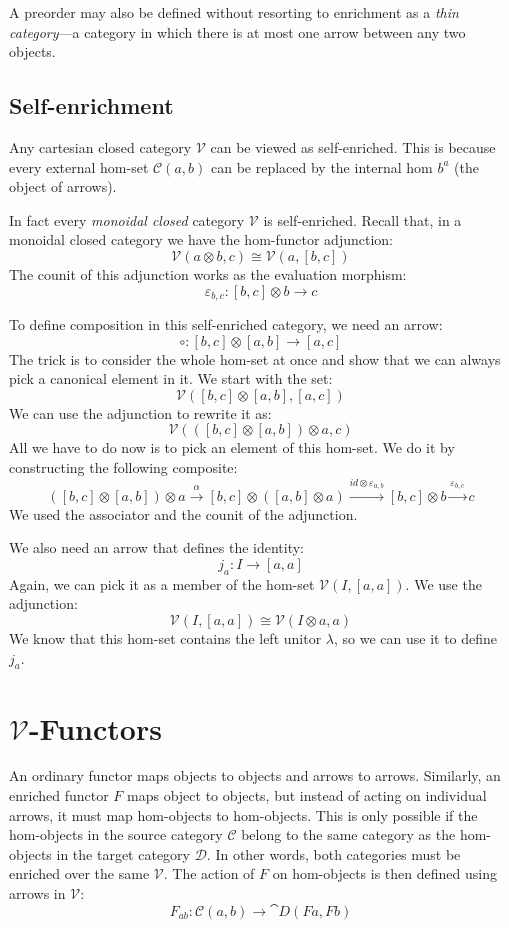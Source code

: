 \documentclass[DaoFP]{subfiles}
\begin{document}
A preorder may also be defined without resorting to enrichment as a \emph{thin category}---a category in which there is at most one arrow between any two objects.

\subsection{Self-enrichment}

Any cartesian closed category $\mathcal V$ can be viewed as self-enriched. This is because every external hom-set $\mathcal C(a, b)$ can be replaced by the internal hom $b^a$ (the object of arrows). 

In fact every \emph{monoidal closed} category $\mathcal V$ is self-enriched. Recall that, in a monoidal closed category we have the hom-functor adjunction:
\[ \mathcal V (a \otimes b, c) \cong \mathcal V (a, [b, c]) \]
The counit of this adjunction works as the evaluation morphism:
\[ \varepsilon_{b, c} \colon [b, c] \otimes b \to c \]

To define composition in this self-enriched category, we need an arrow:
\[ \circ \colon [b, c] \otimes [a, b] \to [a, c] \]
The trick is to consider the whole hom-set at once and show that we can always pick a canonical element in it. We start with the set:
\[ \mathcal V([b, c] \otimes [a, b], [a, c]) \]
We can use the adjunction to rewrite it as:
\[  \mathcal V( ([b, c] \otimes [a, b]) \otimes a, c) \]
All we have to do now is to pick an element of this hom-set. We do it by constructing the following composite:
\[ ([b, c] \otimes [a, b]) \otimes a \xrightarrow{\alpha}  
    [b, c] \otimes ([a, b] \otimes a) \xrightarrow{id \otimes \varepsilon_{a, b} }
    [b, c] \otimes b \xrightarrow{\varepsilon_{b, c}} c \]
We used the associator and the counit of the adjunction.

We also need an arrow that defines the identity:
\[ j_a \colon I \to [a, a] \]
Again, we can pick it as a member of the hom-set $\mathcal V(I, [a, a])$. We use the adjunction:
\[ \mathcal V(I, [a, a]) \cong \mathcal V (I \otimes a, a) \]
We know that this hom-set contains the left unitor $\lambda$, so we can use it to define $j_a$.

\section{$\mathcal V$-Functors} 

An ordinary functor maps objects to objects and arrows to arrows. Similarly, an enriched functor $F$ maps object to objects, but instead of acting on individual arrows, it must map hom-objects to hom-objects. This is only possible if the hom-objects in the source category $\mathcal C$ belong to the same category as the hom-objects in the target category $\mathcal D$. In other words, both categories must be enriched over the same $\mathcal V$. The action of $F$ on hom-objects is then defined using arrows in $\mathcal V$:
\[ F_{a b} \colon \mathcal C (a, b) \to \cat D (F a, F b) \]
\end{document}
